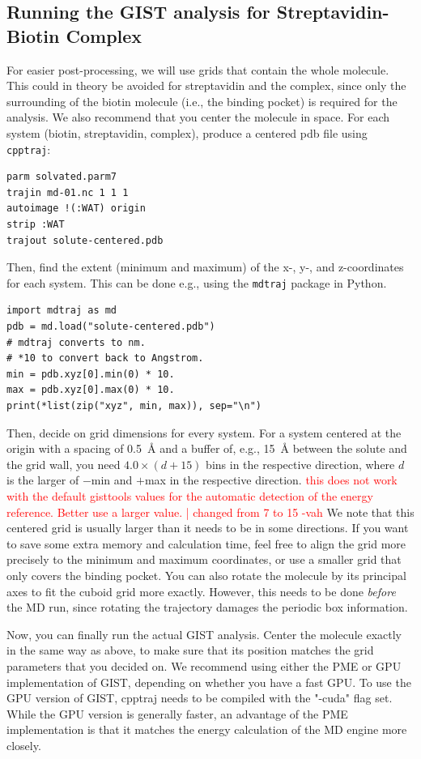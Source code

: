 \documentclass[9pt,tutorial]{livecoms}
\newcommand{\software}{\texttt}
\newcommand{\todo}{\textcolor{red}}
\begin{document}
\subsection{Running the GIST analysis for Streptavidin-Biotin Complex}
For easier post-processing, we will use grids that contain the whole molecule.
This could in theory be avoided for streptavidin and the complex, since only the surrounding of the biotin molecule (i.e., the binding pocket) is required for the analysis.
We also recommend that you center the molecule in space.
For each system (biotin, streptavidin, complex), produce a centered pdb file using \software{cpptraj}:
\begin{lstlisting}
parm solvated.parm7
trajin md-01.nc 1 1 1
autoimage !(:WAT) origin
strip :WAT
trajout solute-centered.pdb
\end{lstlisting}
Then, find the extent (minimum and maximum) of the x-, \mbox{y-,} and z-coordinates for each system.
This can be done e.g., using the \software{mdtraj} package in Python.
\begin{lstlisting}[style=python]
import mdtraj as md
pdb = md.load("solute-centered.pdb")
# mdtraj converts to nm.
# *10 to convert back to Angstrom.
min = pdb.xyz[0].min(0) * 10.
max = pdb.xyz[0].max(0) * 10.
print(*list(zip("xyz", min, max)), sep="\n")
\end{lstlisting}
Then, decide on grid dimensions for every system.
For a system centered at the origin with a spacing of \SI{0.5}{\angstrom} and a buffer of, e.g., \SI{15}{\angstrom} between the solute and the grid wall, you need $4.0\times (d+15)$ bins in the respective direction, where $d$ is the larger of $-$min and $+$max in the respective direction.
\todo{this does not work with the default gisttools values for the automatic detection of the energy reference. Better use a larger value. | changed from 7 to 15 -vah }
We note that this centered grid is usually larger than it needs to be in some directions.
If you want to save some extra memory and calculation time, feel free to align the grid more precisely to the minimum and maximum coordinates, or use a smaller grid that only covers the binding pocket.
You can also rotate the molecule by its principal axes to fit the cuboid grid more exactly.
However, this needs to be done \emph{before} the MD run, since rotating the trajectory damages the periodic box information.

Now, you can finally run the actual GIST analysis. Center the molecule exactly in the same way as above, to make sure that its position matches the grid parameters that you decided on.
We recommend using either the PME or GPU implementation of GIST, depending on whether you have a fast GPU. To use the GPU version of GIST, cpptraj needs to be compiled with the "-cuda" flag set.
While the GPU version is generally faster, an advantage of the PME implementation is that it matches the energy calculation of the MD engine more closely.
\end{document}
